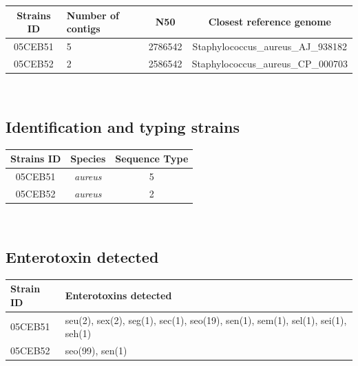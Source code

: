 \documentclass[a4paper]{article}
\begin{document}
{\renewcommand{\arraystretch}{1} %
{\setlength{\tabcolsep}{1cm} %
\centering
\begin{tabular}{|c|p{2cm}|c|c|}
  \hline
  \textbf{Strains ID} & \textbf{Number of contigs} & \textbf{N50} & \textbf{Closest reference genome} \\
  \hline
  05CEB51 & 5 & 2786542 & Staphylococcus\_aureus\_AJ\_938182 \\%
  05CEB52 & 2 & 2586542 & Staphylococcus\_aureus\_CP\_000703 \\%
  \hline 
\end{tabular}\\[1cm]
}}


\subsection{Identification and typing strains \\}


{\renewcommand{\arraystretch}{1} %
{\setlength{\tabcolsep}{1cm} %

\centering
\begin{tabular}{|c|c|c|}
  \hline
  \textbf{Strains ID} & \textbf{Species} & \textbf{Sequence Type} \\
  \hline
  05CEB51 & \textit{aureus} & 5 \\%
  05CEB52 & \textit{aureus} & 2  \\%
  \hline 
\end{tabular}\\[1cm]
}}


\subsection{Enterotoxin detected \\}

{\renewcommand{\arraystretch}{1.5} %
{\setlength{\tabcolsep}{1cm} %
\centering
\begin{tabular}{|l|l|}
  \hline
  \textbf{Strain ID} & \textbf{Enterotoxins detected} \\
  \hline
  05CEB51 & seu(2), sex(2), seg(1), sec(1), seo(19), sen(1), sem(1), sel(1), sei(1), seh(1) \\%
  05CEB52 & {\color{red} seo(99)}, sen(1) \\%
  \hline
\end{tabular}\\
}}
\end{document}
